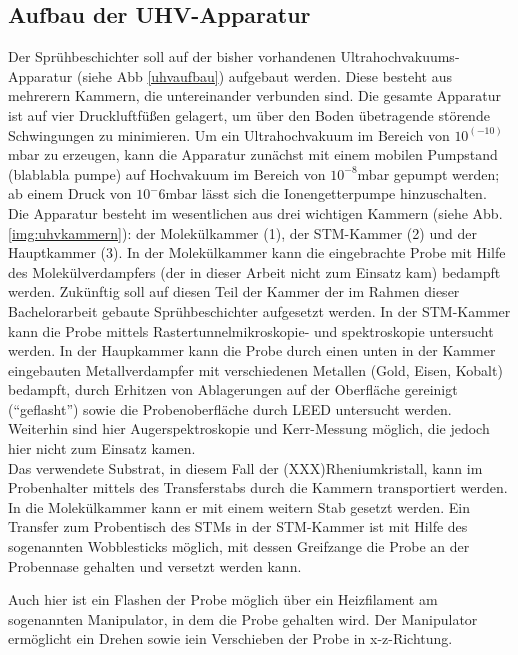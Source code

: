 \subsection{Aufbau der UHV-Apparatur}

Der Sprühbeschichter soll auf der bisher vorhandenen Ultrahochvakuums-Apparatur (siehe Abb
\ref{uhvaufbau}) aufgebaut werden.%
Diese besteht aus mehrerern Kammern, die untereinander verbunden sind. Die gesamte Apparatur ist auf vier
Druckluftfüßen gelagert, um über den Boden übetragende störende Schwingungen zu minimieren. Um ein
Ultrahochvakuum im Bereich von $10^(-10)$mbar zu erzeugen, kann die Apparatur zunächst mit einem
mobilen Pumpstand (blablabla pumpe) auf Hochvakuum im Bereich von $10^{-8}$mbar gepumpt werden; ab
einem Druck von $10^-6$mbar lässt sich die Ionengetterpumpe hinzuschalten.\\
Die Apparatur besteht im wesentlichen aus drei wichtigen Kammern (siehe Abb. \ref{img:uhvkammern}): der 
Molekülkammer (1), der STM-Kammer (2) und der Hauptkammer (3). In der Molekülkammer kann die eingebrachte
Probe mit Hilfe des Molekülverdampfers (der in dieser Arbeit nicht zum Einsatz kam) bedampft werden.
Zukünftig soll auf diesen Teil der Kammer der im Rahmen dieser Bachelorarbeit gebaute
Sprühbeschichter aufgesetzt werden.
In der STM-Kammer kann die Probe
mittels Rastertunnelmikroskopie- und spektroskopie untersucht werden. In der Haupkammer kann die
Probe durch einen unten in der Kammer eingebauten Metallverdampfer mit
verschiedenen Metallen (Gold, Eisen, Kobalt) bedampft, durch Erhitzen von Ablagerungen auf der
Oberfläche gereinigt ("`geflasht"') sowie die Probenoberfläche durch LEED untersucht werden.
Weiterhin sind hier Augerspektroskopie und Kerr-Messung möglich, die jedoch hier nicht zum Einsatz
kamen.\\
Das verwendete Substrat, in diesem Fall der (XXX)Rheniumkristall, kann im Probenhalter mittels des
Transferstabs durch die Kammern transportiert werden. In die Molekülkammer kann er mit einem weitern
Stab gesetzt werden. Ein Transfer zum Probentisch des STMs in der STM-Kammer ist mit Hilfe des
sogenannten Wobblesticks möglich, mit dessen Greifzange die Probe an der Probennase gehalten und
versetzt werden kann.

 Auch hier ist ein
Flashen der Probe möglich über ein Heizfilament am sogenannten Manipulator, in dem die Probe gehalten wird.
Der Manipulator ermöglicht ein Drehen sowie iein Verschieben der Probe in x-z-Richtung.\\



